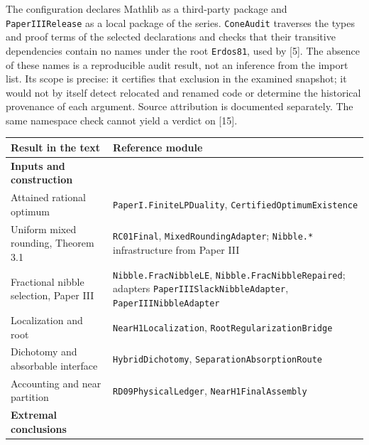 \documentclass[english,11pt,a4paper]{article}
\newcounter{none}
\begin{document}
The configuration declares Mathlib as a third-party package and \nolinkurl{PaperIIIRelease} as a local package of the series. \nolinkurl{ConeAudit} traverses the types and proof terms of the selected declarations and checks that their transitive dependencies contain no names under the root \nolinkurl{Erdos81}, used by {[}5{]}. The absence of these names is a reproducible audit result, not an inference from the import list. Its scope is precise: it certifies that exclusion in the examined snapshot; it would not by itself detect relocated and renamed code or determine the historical provenance of each argument. Source attribution is documented separately. The same namespace check cannot yield a verdict on {[}15{]}.

{\def\LTcaptype{none} %
\begin{longtable}[c]{@{}
  >{\raggedright\arraybackslash}p{}
  >{\raggedright\arraybackslash}p{}@{}}
\toprule\noalign{}
\begin{minipage}[b]{\linewidth}\raggedright
Result in the text
\end{minipage} & \begin{minipage}[b]{\linewidth}\raggedright
Reference module
\end{minipage} \\
\midrule\noalign{}
\endhead
\bottomrule\noalign{}
\endlastfoot
\textbf{Inputs and construction} & \\
Attained rational optimum & \nolinkurl{PaperI.FiniteLPDuality}, \nolinkurl{CertifiedOptimumExistence} \\
Uniform mixed rounding, Theorem 3.1 & \nolinkurl{RC01Final}, \nolinkurl{MixedRoundingAdapter}; \nolinkurl{Nibble.*} infrastructure from Paper III \\
Fractional nibble selection, Paper III & \nolinkurl{Nibble.FracNibbleLE}, \nolinkurl{Nibble.FracNibbleRepaired}; adapters \nolinkurl{PaperIIISlackNibbleAdapter}, \nolinkurl{PaperIIINibbleAdapter} \\
Localization and root & \nolinkurl{NearH1Localization}, \nolinkurl{RootRegularizationBridge} \\
Dichotomy and absorbable interface & \nolinkurl{HybridDichotomy}, \nolinkurl{SeparationAbsorptionRoute} \\
Accounting and near partition & \nolinkurl{RD09PhysicalLedger}, \nolinkurl{NearH1FinalAssembly} \\
\textbf{Extremal conclusions} & \\

\end{longtable}}
\end{document}
